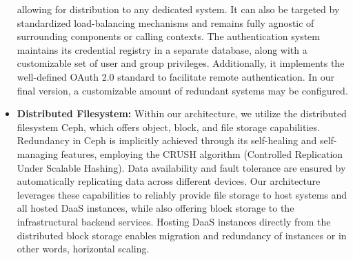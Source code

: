 \documentclass[runningheads]{llncs}
\begin{document}
\begin{itemize}
	      allowing for distribution to any dedicated system.
	      It can also be targeted by standardized load-balancing mechanisms
	      and remains fully agnostic of surrounding components
	      or calling contexts.
	      The authentication system maintains its credential registry
	      in a separate database, along with a customizable set
	      of user and group privileges.
	      Additionally, it implements the well-defined OAuth 2.0 standard
	      to facilitate remote authentication.
	      In our final version,
	      a customizable amount of redundant systems may be configured.
	\item \textbf{Distributed Filesystem:}
	      Within our architecture, we utilize the distributed filesystem Ceph,
	      which offers object, block, and file storage capabilities.
	      Redundancy in Ceph is implicitly achieved
	      through its self-healing and self-managing features, employing
	      the CRUSH algorithm (Controlled Replication Under Scalable Hashing).
	      Data availability and fault tolerance are ensured
	      by automatically replicating data across different devices.
	      Our architecture leverages these capabilities
	      to reliably provide file storage to host systems
	      and all hosted DaaS instances,
	      while also offering block storage to the infrastructural backend services.
	      Hosting DaaS instances directly from the distributed block storage
	      enables migration and redundancy of instances or in other words, horizontal scaling.
\end{itemize}
\end{document}
